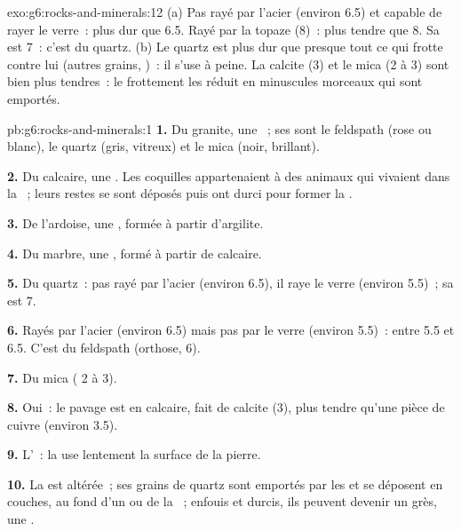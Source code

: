 \begin{solution}{exo:g6:rocks-and-minerals:12}
(a) Pas rayé par l'acier (environ 6.5) et capable de rayer le verre~: plus
dur que 6.5. Rayé par la topaze (8)~: plus tendre que 8. Sa  est 7~:
c'est du quartz. (b) Le quartz est plus dur que presque tout ce qui frotte
contre lui (autres grains, )~: il s'use à peine. La calcite (3) et le
mica (2 à 3) sont bien plus tendres~: le frottement les réduit en
minuscules morceaux qui sont emportés.
\end{solution}

\begin{solution}{pb:g6:rocks-and-minerals:1}
\textbf{1.} Du granite, une ~; ses  sont le feldspath
(rose ou blanc), le quartz (gris, vitreux) et le mica (noir, brillant).

\textbf{2.} Du calcaire, une . Les coquilles
appartenaient à des animaux qui vivaient dans la ~; leurs restes se
sont déposés puis ont durci pour former la .

\textbf{3.} De l'ardoise, une , formée à partir d'argilite.

\textbf{4.} Du marbre, une , formé à partir de calcaire.

\textbf{5.} Du quartz~: pas rayé par l'acier (environ 6.5), il raye le
verre (environ 5.5)~; sa  est 7.

\textbf{6.} Rayés par l'acier (environ 6.5) mais pas par le verre (environ
5.5)~: entre 5.5 et 6.5. C'est du feldspath (orthose, 6).

\textbf{7.} Du mica ( 2 à 3).

\textbf{8.} Oui~: le pavage est en calcaire, fait de calcite (3), plus
tendre qu'une pièce de cuivre (environ 3.5).

\textbf{9.} L'~: la  use lentement la surface de la pierre.

\textbf{10.} La  est altérée~; ses grains de quartz sont emportés
par les  et se déposent en couches, au fond d'un  ou de la
~; enfouis et durcis, ils peuvent devenir un grès, une .


\end{solution}
